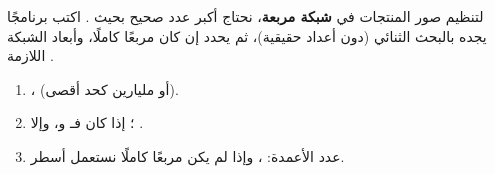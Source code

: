 \begin{statement}
لتنظيم صور المنتجات في \textbf{شبكة مربعة}، نحتاج أكبر عدد صحيح  بحيث . اكتب برنامجًا يجده بالبحث الثنائي (دون أعداد حقيقية)، ثم يحدد إن كان  مربعًا كاملًا، وأبعاد الشبكة اللازمة .
\end{statement}
\begin{stepsbox}\begin{enumerate}
\item {}،  (أو مليارين كحد أقصى).
\item {}؛ إذا كان  فـ  و، وإلا .
\item عدد الأعمدة: ، وإذا لم يكن مربعًا كاملًا نستعمل  أسطر.
\end{enumerate}\end{stepsbox}
